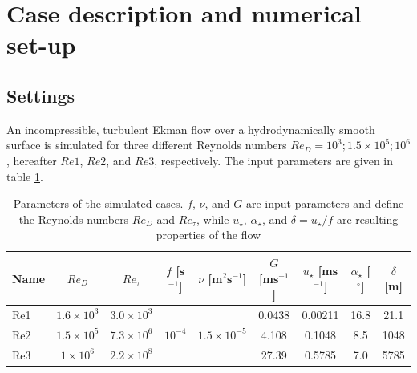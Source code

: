 \documentclass[a4paper,11pt]{article}
\begin{document}
\section{Case description and numerical set-up}
\label{setup}
%
%

\subsection{Settings}

An incompressible, turbulent Ekman flow over a hydrodynamically smooth surface is simulated for three different Reynolds numbers $Re_D = 10^3;1.5\times 10^5;10^6$, hereafter $Re1$, $Re2$, and $Re3$, respectively. The input parameters are given in table \ref{simulation_parameters}.

\begin{table}
	\centering
	\caption{Parameters of the simulated cases. $f$, $\nu$, and $G$ are input parameters and define the Reynolds numbers $Re_D$ and $Re_\tau$, while $u_\star$, $\alpha_\star$, and $\delta = u_\star/f$ are resulting properties of the flow}
	\begin{tabular}{lcccccccc}
          \toprule  
	  Name & $Re_D$ & $Re_\tau$ & $f$ [s$^{-1}$] & $\nu$ [m$^2$s$^{-1}$] & $G$ [ms$^{-1}$] & $u_\star$ [ms$^{-1}$] & $\alpha_\star$ [$^\circ$]& $\delta$ [m] \\
          \midrule
	  Re1 & $1.6\times10^3$ & $3.0\times10^3$ &  &  & 0.0438 & 0.00211 & 16.8 & 21.1 \\
	  Re2 & $1.5\times10^5$ & $7.3\times10^6$ & $10^{-4}$ & $1.5\times10^{-5}$ & 4.108 & 0.1048 & 8.5 & 1048\\
	  Re3 & $1\times10^6$ & $2.2\times10^8$ &  &  & 27.39 & 0.5785 & 7.0 & 5785 \\
          \bottomrule
	\end{tabular}
	\label{simulation_parameters}
\end{table}
\end{document}
